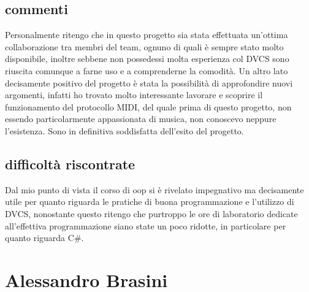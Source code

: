 \documentclass[a4paper,12pt]{report}
\begin{document}
\subsection{commenti}
Personalmente ritengo che in questo progetto sia stata effettuata un'ottima collaborazione tra membri del team, ognuno di quali è sempre stato molto disponibile, inoltre sebbene non possedessi molta esperienza col DVCS sono riuscita comunque a farne uso e a comprenderne la comodità. Un altro lato decisamente positivo del progetto è stata la possibilità di approfondire nuovi argomenti, infatti ho trovato molto interessante lavorare e scoprire il funzionamento del protocollo MIDI, del quale prima di questo progetto, non essendo particolarmente appassionata di musica, non conoscevo neppure l'esistenza. Sono in definitiva soddisfatta dell'esito del progetto.
\subsection{difficoltà riscontrate}
Dal mio punto di vista il corso di oop si è rivelato impegnativo ma decisamente utile per quanto riguarda le pratiche di buona programmazione e l'utilizzo di DVCS, nonostante questo ritengo che purtroppo le ore di laboratorio dedicate all'effettiva programmazione siano state un poco ridotte, in particolare per quanto riguarda C\#.
\newpage

\section{Alessandro Brasini}
\end{document}
